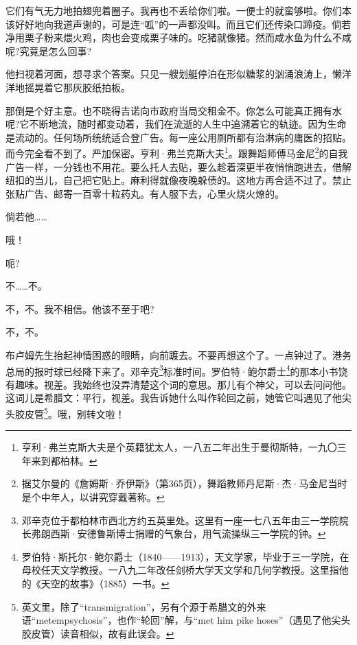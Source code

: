 \par 它们有气无力地拍翅兜着圈子。我再也不丢给你们啦。一便士的就蛮够啦。你们本该好好地向我道声谢的，可是连“呱”的一声都没叫。而且它们还传染口蹄疫。倘若净用栗子粉来煨火鸡，肉也会变成栗子味的。吃猪就像猪。然而咸水鱼为什么不咸呢?究竟是怎么回事?
\par 他扫视着河面，想寻求个答案。只见一艘划艇停泊在形似糖浆的汹涌浪涛上，懒洋洋地摇晃着它那灰胶纸拍板。
\par 那倒是个好主意。也不晓得吉诺向市政府当局交租金不。你怎么可能真正拥有水呢?它不断地流，随时都变动着，我们在流逝的人生中追溯着它的轨迹。因为生命是流动的。任何场所统统适合登广告。每一座公用厕所都有治淋病的庸医的招贴。而今完全看不到了。严加保密。亨利·弗兰克斯大夫\footnote{亨利·弗兰克斯大夫是个英籍犹太人，一八五二年出生于曼彻斯特，一九〇三年来到都柏林。}。跟舞蹈师傅马金尼\footnote{据艾尔曼的《詹姆斯·乔伊斯》（第365页），舞蹈教师丹尼斯·杰·马金尼当时是个中年人，以讲究穿戴著称。}的自我广告一样，一分钱也不用花。要么托人去贴，要么趁着深更半夜悄悄跑进去，借解纽扣的当儿，自己把它贴上。麻利得就像夜晚躲债的。这地方再合适不过了。禁止张贴广告、邮寄一百零十粒药丸。有人服下去，心里火烧火燎的。
\par 倘若他……
\par 哦！
\par 呃?
\par 不……不。
\par 不，不。我不相信。他该不至于吧?
\par 不，不。
\par 布卢姆先生抬起神情困惑的眼睛，向前踱去。不要再想这个了。一点钟过了。港务总局的报时球已经降下来了。邓辛克\footnote{邓辛克位于都柏林市西北方约五英里处。这里有一座一七八五年由三一学院院长弗朗西斯·安德鲁斯博士捐赠的气象台，用气流操纵三一学院的钟。}标准时间。罗伯特·鲍尔爵士\footnote{罗伯特·斯托尔·鲍尔爵士（1840——1913），天文学家，毕业于三一学院，在母校任天文学教授。一八九二年改任剑桥大学天文学和几何学教授。这里指他的《天空的故事》（1885）一书。}的那本小书饶有趣味。视差。我始终也没弄清楚这个词的意思。那儿有个神父，可以去问问他。这词儿是希腊文：平行，视差。我告诉她什么叫作轮回之前，她管它叫遇见了他尖头胶皮管\footnote{英文里，除了“transmigration”，另有个源于希腊文的外来语“metempsychosis”，也作“轮回”解，与“met him pike hoses”（遇见了他尖头胶皮管）读音相似，故有此误会。}。哦，别转文啦！
